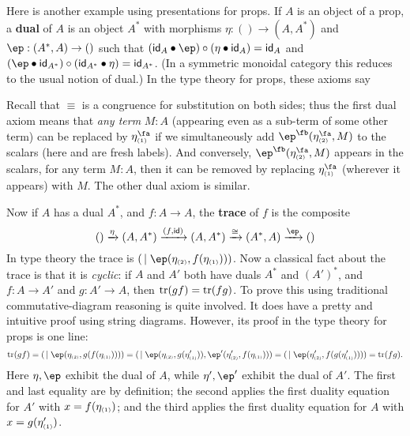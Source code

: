 \begin{props}
Here is another example using presentations for props.
If $A$ is an object of a prop, a \textbf{dual} of $A$ is an object $A^*$ with morphisms $\eta:()\to (A,A^*)$ and $\ep:(A^*,A)\to ()$ such that $(\idfunc_A \ptens \ep) \circ (\eta \ptens \idfunc_A) = \idfunc_A$ and $(\ep\ptens \idfunc_{A^*}) \circ (\idfunc_{A^*}\ptens \eta) = \idfunc_{A^*}$.
(In a symmetric monoidal category this reduces to the usual notion of dual.)
In the type theory for props, these axioms say
Recall that $\equiv$ is a congruence for substitution on both sides; thus the first dual axiom means that \emph{any term} $M:A$ (appearing even as a sub-term of some other term) can be replaced by $\eta\s1^\fa$ if we simultaneously add $\ep^\fb(\eta\s2^\fa,M)$ to the scalars (here \fa and \fb are fresh labels).
And conversely, $\ep^\fb(\eta\s2^\fa,M)$ appears in the scalars, for any term $M:A$, then it can be removed by replacing $\eta\s1^\fa$ (wherever it appears) with $M$.
The other dual axiom is similar.

Now if $A$ has a dual $A^*$, and $f:A\to A$, the \textbf{trace} of $f$ is the composite
\[ () \xto{\eta} (A,A^*) \xto{(f,\idfunc)} (A,A^*) \xto{\cong} (A^*,A) \xto{\ep} () \]
In type theory the trace is $(\,\mid \ep(\eta\s2,f(\eta\s1)))$.
Now a classical fact about the trace is that it is \emph{cyclic}: if $A$ and $A'$ both have duals $A^*$ and $(A')^*$, and $f:A\to A'$ and $g:A'\to A$, then $\mathrm{tr}(gf) = \mathrm{tr}(fg)$.
To prove this using traditional commutative-diagram reasoning is quite involved.
It does have a pretty and intuitive proof using string diagrams.
However, its proof in the type theory for props is one line:
\[ \tr(gf) = (\,\mid \ep(\eta\s2,g(f(\eta\s1))))
= (\,\mid \ep(\eta\s2,g(\eta'\s1)),\ep'(\eta'\s2,f(\eta\s1)))
= (\,\mid \ep(\eta'\s2,f(g(\eta'\s1))))
= \tr(fg).
\]
Here $\eta,\ep$ exhibit the dual of $A$, while $\eta',\ep'$ exhibit the dual of $A'$.
The first and last equality are by definition;
the second applies the first duality equation for $A'$ with $x=f(\eta_{\scriptscriptstyle(1)})$; and the third applies the first duality equation for $A$ with $x=g(\eta'_{\scriptscriptstyle(1)})$.



\end{props}
